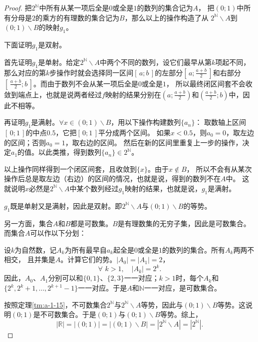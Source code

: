 \documentclass[12pt,UTF8]{ctexbook}
\begin{document}
\begin{appendix}
\begin{proof}
    把$2^\mathbb{N}$中所有从某一项后全是$0$或全是$1$的数列的集合记为$A$，
    把$(0;1)$中所有分母是$2$的乘方的有理数的集合记为$B$，那么以上的操作构造了从
    $2^\mathbb{N}\backslash A$到$(0;1)\backslash B$的映射$g_1$。

    下面证明$g_1$是双射。

    首先证明$g_1$是单射。给定$2^\mathbb{N}\backslash A$中两个不同的数列，设它们最早从第$k$项起不同，
    那么对应的第$k$步操作时就会选择同一区间$[\,a; b\,]$的左部分$[\,a;\frac{a+b}{2}\,]$和右部分$[\,\frac{a+b}{2};b\,]$。而由于数列不会从某一项后全是$0$或全是$1$，
    所以最终闭区间套不会收敛到端点上，也就是说两者经过$f$映射的结果分别在$(a;\frac{a+b}{2})$和$(\frac{a+b}{2};b)$中，因此不相等。

    再证明$g_1$是满射。$\forall x \in (0;1)\backslash B$，用以下操作构建数列$\{a_n\}$：
    取数轴上区间$[\,0;1\,]$的中点$0.5$，它把$[\,0;1\,]$平分成两个区间。
    如果$x<0.5$，则$a_0=0$，取左边的区间；否则$a_0=1$，取右边的区间。
    然后在新的区间里重复上一步的操作，决定$a_1$的值。以此类推，得到数列$\{a_n\}\in 2^\mathbb{N}$。

    以上操作同样得到一个闭区间套，且收敛到$\{x\}$。由于$x\notin B$，
    所以不会有从某次操作后总是取左边（右边）的区间的情况，也就是说，得到的数列不在$A$中。
    这就说明$x$必然是$2^\mathbb{N}\backslash A$中某个数列经过$g_1$映射的结果，也就是说，$g_1$是满射。
    
    $g_1$既是单射又是满射，因此是双射。即$2^\mathbb{N}\backslash A$与$(0;1)\backslash B$的等势。

    另一方面，集合$A$和$B$都是可数集。$B$是有理数集的无穷子集，因此是可数集合。
    而集合$A$可以作以下分划：

    设$k$为自然数，记$A_k$为所有最早自$a_k$起全是$0$或全是$1$的数列的集合。所有$A_k$两两不相交，
    且并集是$A$。计算它们的势。$|A_0| = |A_1| = 2$，
    $$ \forall \,\, k > 1, \quad |A_k| = 2^k. $$
    因此，$A_0$、$A_1$分别可以和$\{0,1\}$、$\{2,3\}$一一对应；$k>1$时，每个$A_k$和$\{2^k,2^k+1,\ldots, 2^{k+1}-1\}$一一对应。于是$A$和$\mathbb{N}$一一对应，是可数集合。

    按照定理\ref{tm:a-1-15}，不可数集合$2^\mathbb{N}$与$2^\mathbb{N}\backslash A$等势，因此与$(0;1)\backslash B$等势。这说明$(0;1)$是不可数集合。于是$(0;1)$与$(0;1)\backslash B$等势。综上，
    $$ |\mathbb{R}| = |(0;1)| = |(0;1)\backslash B| = |2^\mathbb{N}\backslash A| = |2^\mathbb{N}|. $$


\end{proof}
\end{appendix}
\end{document}
